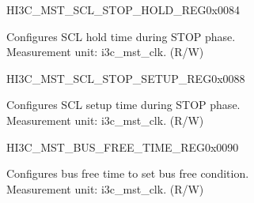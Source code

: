\begin{register}{H}{I3C\_MST\_SCL\_STOP\_HOLD\_REG}{0x0084}\label{regdesc:I3CMSTSCLSTOPHOLDREG}
%
%
\regnewline%
\begin{regdesc}\begin{reglist}
\label{fielddesc:I3CMSTREGSCLSTOPHOLDTIME}\item [I3C\_MST\_REG\_SCL\_STOP\_HOLD\_TIME] Configures SCL hold time during STOP phase.\\
Measurement unit: i3c\_mst\_clk. (R/W)
\end{reglist}\end{regdesc}
\end{register}


\begin{register}{H}{I3C\_MST\_SCL\_STOP\_SETUP\_REG}{0x0088}\label{regdesc:I3CMSTSCLSTOPSETUPREG}
%
%
\regnewline%
\begin{regdesc}\begin{reglist}
\label{fielddesc:I3CMSTREGSCLSTOPSETUPTIME}\item [I3C\_MST\_REG\_SCL\_STOP\_SETUP\_TIME] Configures SCL setup time during STOP phase.\\
Measurement unit: i3c\_mst\_clk. (R/W)
\end{reglist}\end{regdesc}
\end{register}


\begin{register}{H}{I3C\_MST\_BUS\_FREE\_TIME\_REG}{0x0090}\label{regdesc:I3CMSTBUSFREETIMEREG}
%
%
\regnewline%
\begin{regdesc}\begin{reglist}
\label{fielddesc:I3CMSTREGBUSFREETIME}\item [I3C\_MST\_REG\_BUS\_FREE\_TIME] Configures bus free time to set bus free condition.\\
Measurement unit: i3c\_mst\_clk. (R/W)
\end{reglist}\end{regdesc}
\end{register}


